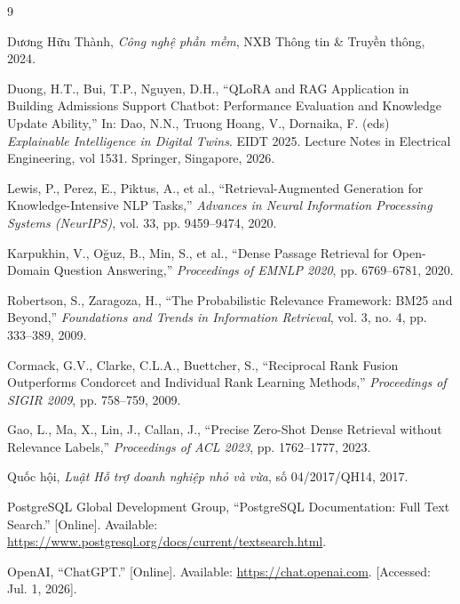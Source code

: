 \documentclass[12pt,a4paper]{report}
\numberwithin{equation}{chapter}
\numberwithin{figure}{chapter}
\numberwithin{table}{chapter}
\begin{document}
\clearpage
{}
{}
\begin{thebibliography}{9}

Dương Hữu Thành, \textit{Công nghệ phần mềm}, NXB Thông tin \& Truyền thông, 2024.

Duong, H.T., Bui, T.P., Nguyen, D.H., ``QLoRA and RAG Application in Building Admissions Support Chatbot: Performance Evaluation and Knowledge Update Ability,'' In: Dao, N.N., Truong Hoang, V., Dornaika, F. (eds) \textit{Explainable Intelligence in Digital Twins}. EIDT 2025. Lecture Notes in Electrical Engineering, vol 1531. Springer, Singapore, 2026.

Lewis, P., Perez, E., Piktus, A., et al., ``Retrieval-Augmented Generation for
Knowledge-Intensive NLP Tasks,'' \textit{Advances in Neural Information
Processing Systems (NeurIPS)}, vol. 33, pp. 9459--9474, 2020.

Karpukhin, V., Oğuz, B., Min, S., et al., ``Dense Passage Retrieval for
Open-Domain Question Answering,'' \textit{Proceedings of EMNLP 2020},
pp. 6769--6781, 2020.

Robertson, S., Zaragoza, H., ``The Probabilistic Relevance Framework: BM25 and
Beyond,'' \textit{Foundations and Trends in Information Retrieval}, vol. 3,
no. 4, pp. 333--389, 2009.

Cormack, G.V., Clarke, C.L.A., Buettcher, S., ``Reciprocal Rank Fusion
Outperforms Condorcet and Individual Rank Learning Methods,''
\textit{Proceedings of SIGIR 2009}, pp. 758--759, 2009.

Gao, L., Ma, X., Lin, J., Callan, J., ``Precise Zero-Shot Dense Retrieval without
Relevance Labels,'' \textit{Proceedings of ACL 2023}, pp. 1762--1777, 2023.

Quốc hội, \textit{Luật Hỗ trợ doanh nghiệp nhỏ và vừa}, số 04/2017/QH14, 2017.

PostgreSQL Global Development Group, ``PostgreSQL Documentation: Full Text
Search.'' [Online]. Available:
\url{https://www.postgresql.org/docs/current/textsearch.html}.

OpenAI, ``ChatGPT.'' [Online]. Available: \url{https://chat.openai.com}. [Accessed: Jul. 1, 2026].

\end{thebibliography}
\end{document}

